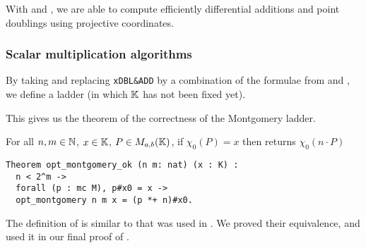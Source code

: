 With  and , we are able to compute efficiently
differential additions and point doublings using projective coordinates.

\subsubsection{Scalar multiplication algorithms}
\label{subsec:ECC-ladder}

By taking  and replacing \texttt{xDBL\&ADD} by a
combination of the formulae from  and ,
we define a ladder  (in which $\mathbb{K}$ has not been fixed yet).

%

This gives us the theorem of the correctness of the Montgomery ladder.
\begin{theorem}
  \label{thm:montgomery-ladder-correct}
  For all $n, m \in \mathbb{N}$, $x \in \mathbb{K}$, $P \in M_{a,b}(\mathbb{K})$,
  if $\chi_0(P) = x$ then  returns $\chi_0(n \cdot P)$
\end{theorem}
\begin{lstlisting}[language=Coq]
Theorem opt_montgomery_ok (n m: nat) (x : K) :
  n < 2^m ->
  forall (p : mc M), p#x0 = x ->
  opt_montgomery n m x = (p *+ n)#x0.
\end{lstlisting}
The definition of  is similar to 
that was used in .
We proved their equivalence, and used it in our
final proof of .


